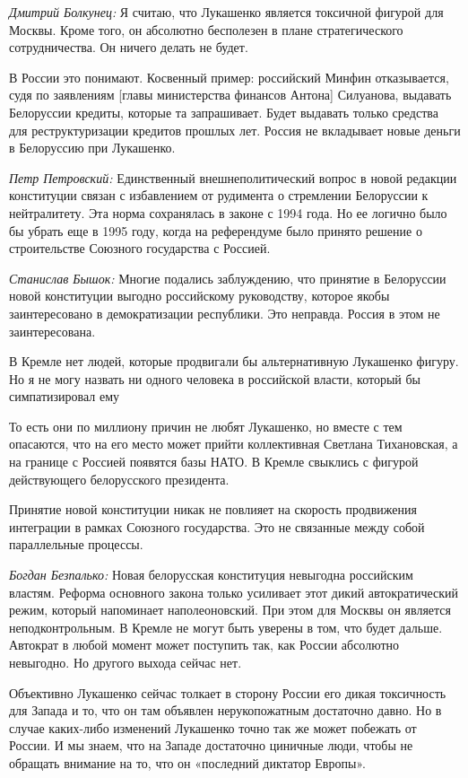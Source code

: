\textit{Дмитрий Болкунец:} Я считаю, что Лукашенко является токсичной фигурой для Москвы. Кроме того, он абсолютно бесполезен в плане стратегического сотрудничества. Он ничего делать не будет.

В России это понимают. Косвенный пример: российский Минфин отказывается, судя по заявлениям [главы министерства финансов Антона] Силуанова, выдавать Белоруссии кредиты, которые та запрашивает. Будет выдавать только средства для реструктуризации кредитов прошлых лет. Россия не вкладывает новые деньги в Белоруссию при Лукашенко.

\textit{Петр Петровский:} Единственный внешнеполитический вопрос в новой редакции конституции связан с избавлением от рудимента о стремлении Белоруссии к нейтралитету. Эта норма сохранялась в законе с 1994 года. Но ее логично было бы убрать еще в 1995 году, когда на референдуме было принято решение о строительстве Союзного государства с Россией.

\textit{Станислав Бышок:} Многие подались заблуждению, что принятие в Белоруссии новой конституции выгодно российскому руководству, которое якобы заинтересовано в демократизации республики. Это неправда. Россия в этом не заинтересована.

\begin{fancyquotes}
    В Кремле нет людей, которые продвигали бы альтернативную Лукашенко фигуру. Но я не могу назвать ни одного человека в российской власти, который бы симпатизировал ему
\end{fancyquotes}

То есть они по миллиону причин не любят Лукашенко, но вместе с тем опасаются, что на его место может прийти коллективная Светлана Тихановская, а на границе с Россией появятся базы НАТО. В Кремле свыклись с фигурой действующего белорусского президента.

Принятие новой конституции никак не повлияет на скорость продвижения интеграции в рамках Союзного государства. Это не связанные между собой параллельные процессы.

\textit{Богдан Безпалько:} Новая белорусская конституция невыгодна российским властям. Реформа основного закона только усиливает этот дикий автократический режим, который напоминает наполеоновский. При этом для Москвы он является неподконтрольным. В Кремле не могут быть уверены в том, что будет дальше. Автократ в любой момент может поступить так, как России абсолютно невыгодно. Но другого выхода сейчас нет.

Объективно Лукашенко сейчас толкает в сторону России его дикая токсичность для Запада и то, что он там объявлен нерукопожатным достаточно давно. Но в случае каких-либо изменений Лукашенко точно так же может побежать от России. И мы знаем, что на Западе достаточно циничные люди, чтобы не обращать внимание на то, что он «последний диктатор Европы».

